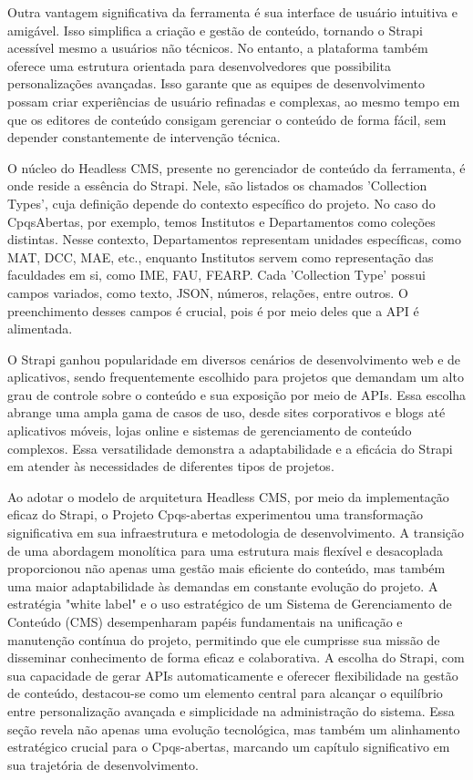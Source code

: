 Outra vantagem significativa da ferramenta é sua interface de usuário intuitiva e amigável. Isso simplifica a criação e gestão de conteúdo, tornando o Strapi acessível mesmo a usuários não técnicos. No entanto, a plataforma também oferece uma estrutura orientada para desenvolvedores que possibilita personalizações avançadas. Isso garante que as equipes de desenvolvimento possam criar experiências de usuário refinadas e complexas, ao mesmo tempo em que os editores de conteúdo consigam gerenciar o conteúdo de forma fácil, sem depender constantemente de intervenção técnica.

O núcleo do Headless CMS, presente no gerenciador de conteúdo da ferramenta, é onde reside a essência do Strapi. Nele, são listados os chamados 'Collection Types', cuja definição depende do contexto específico do projeto. No caso do CpqsAbertas, por exemplo, temos Institutos e Departamentos como coleções distintas. Nesse contexto, Departamentos representam unidades específicas, como MAT, DCC, MAE, etc., enquanto Institutos servem como representação das faculdades em si, como IME, FAU, FEARP. Cada 'Collection Type' possui campos variados, como texto, JSON, números, relações, entre outros. O preenchimento desses campos é crucial, pois é por meio deles que a API é alimentada.


O Strapi ganhou popularidade em diversos cenários de desenvolvimento web e de aplicativos, sendo frequentemente escolhido para projetos que demandam um alto grau de controle sobre o conteúdo e sua exposição por meio de APIs. Essa escolha abrange uma ampla gama de casos de uso, desde sites corporativos e blogs até aplicativos móveis, lojas online e sistemas de gerenciamento de conteúdo complexos. Essa versatilidade demonstra a adaptabilidade e a eficácia do Strapi em atender às necessidades de diferentes tipos de projetos.

Ao adotar o modelo de arquitetura Headless CMS, por meio da implementação eficaz do Strapi, o Projeto Cpqs-abertas experimentou uma transformação significativa em sua infraestrutura e metodologia de desenvolvimento. A transição de uma abordagem monolítica para uma estrutura mais flexível e desacoplada proporcionou não apenas uma gestão mais eficiente do conteúdo, mas também uma maior adaptabilidade às demandas em constante evolução do projeto. A estratégia "white label" e o uso estratégico de um Sistema de Gerenciamento de Conteúdo (CMS) desempenharam papéis fundamentais na unificação e manutenção contínua do projeto, permitindo que ele cumprisse sua missão de disseminar conhecimento de forma eficaz e colaborativa. A escolha do Strapi, com sua capacidade de gerar APIs automaticamente e oferecer flexibilidade na gestão de conteúdo, destacou-se como um elemento central para alcançar o equilíbrio entre personalização avançada e simplicidade na administração do sistema. Essa seção revela não apenas uma evolução tecnológica, mas também um alinhamento estratégico crucial para o Cpqs-abertas, marcando um capítulo significativo em sua trajetória de desenvolvimento.

